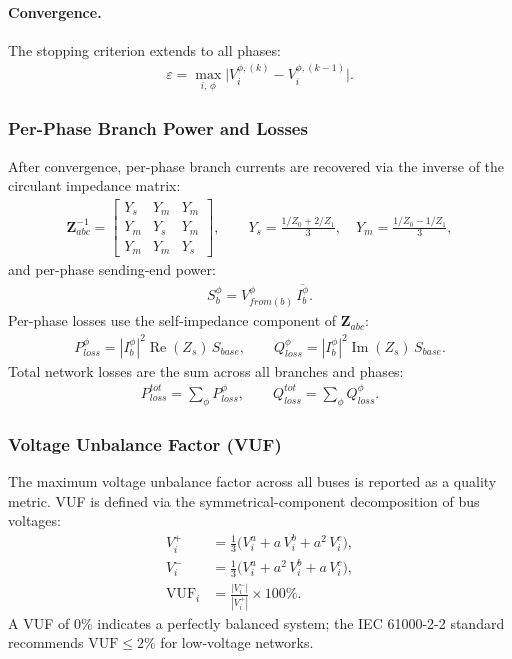 \paragraph{Convergence.}
The stopping criterion extends to all phases:
\begin{align}
  \varepsilon = \max_{i,\,\phi} \bigl|V_i^{\phi,(k)} - V_i^{\phi,(k-1)}\bigr|.
\end{align}

\subsubsection{Per-Phase Branch Power and Losses}

After convergence, per-phase branch currents are recovered via the inverse of the
circulant impedance matrix:
\begin{align}
  \mathbf{Z}_{abc}^{-1} =
  \begin{bmatrix}
    Y_s & Y_m & Y_m \\
    Y_m & Y_s & Y_m \\
    Y_m & Y_m & Y_s
  \end{bmatrix},
  \qquad
  Y_s = \frac{1/Z_0 + 2/Z_1}{3}, \quad
  Y_m = \frac{1/Z_0 - 1/Z_1}{3},
\end{align}
and per-phase sending-end power:
\begin{align}
  S_b^{\phi} = V_{from(b)}^{\phi}\, \overline{I_b^{\phi}}.
\end{align}
Per-phase losses use the self-impedance component of $\mathbf{Z}_{abc}$:
\begin{align}
  P_{loss}^{\phi} = |I_b^{\phi}|^2 \operatorname{Re}(Z_s)\, S_{base},
  \qquad
  Q_{loss}^{\phi} = |I_b^{\phi}|^2 \operatorname{Im}(Z_s)\, S_{base}.
\end{align}
Total network losses are the sum across all branches and phases:
\begin{align}
  P_{loss}^{tot} = \sum_{\phi} P_{loss}^{\phi}, \qquad
  Q_{loss}^{tot} = \sum_{\phi} Q_{loss}^{\phi}.
\end{align}

\subsubsection{Voltage Unbalance Factor (VUF)}

The maximum voltage unbalance factor across all buses is reported as a quality
metric.  VUF is defined via the symmetrical-component decomposition of bus
voltages:
\begin{align}
  V_i^{+} &= \frac{1}{3}\bigl(V_i^a + a\,V_i^b + a^2\,V_i^c\bigr), \\
  V_i^{-} &= \frac{1}{3}\bigl(V_i^a + a^2\,V_i^b + a\,V_i^c\bigr), \\
  \mathrm{VUF}_i &= \frac{|V_i^{-}|}{|V_i^{+}|} \times 100\%.
\end{align}
A VUF of $0\%$ indicates a perfectly balanced system; the IEC 61000-2-2 standard
recommends $\mathrm{VUF} \le 2\%$ for low-voltage networks.

